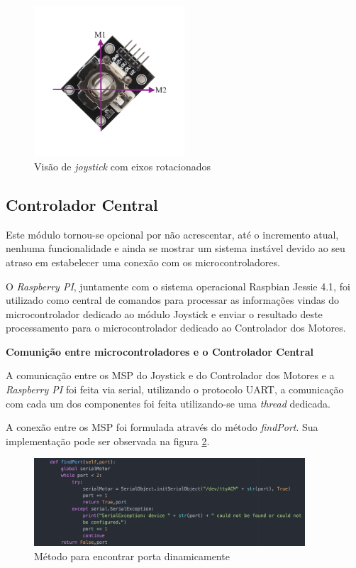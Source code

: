 		\begin{figure}[!ht]
			\center
			\includegraphics[width=0.5\textwidth]{figuras/resultados/joy_m1m2}
			\caption{Visão de \textit{joystick} com eixos rotacionados}
			\label{fig:joy_m1m2}
		\end{figure}

	\subsection{Controlador Central}

		Este módulo tornou-se opcional por não acrescentar, até o incremento atual, nenhuma funcionalidade e ainda se mostrar um sistema instável devido ao seu atraso em estabelecer uma conexão com os microcontroladores.

		O \textit{Raspberry PI}, juntamente com o sistema operacional Raspbian Jessie 4.1, foi utilizado como central de comandos para processar as informações vindas do microcontrolador dedicado ao módulo Joystick e enviar o resultado deste processamento para o microcontrolador dedicado ao Controlador dos Motores.

		\textbf{Comunição entre microcontroladores e o Controlador Central}

		A comunicação entre os MSP do Joystick e do Controlador dos Motores e a \textit{Raspberry PI} foi feita via serial, utilizando o protocolo UART, a comunicação com cada um dos componentes foi feita utilizando-se uma \textit{thread} dedicada.

		A conexão entre os MSP foi formulada através do método \textit{findPort}. Sua implementação pode ser observada na figura \ref{fig:find_port_method}.

		\begin{figure}[!htb]
			\centering
			\includegraphics[width=0.9\textwidth]{figuras/resultados/find_port_method}
			\caption{Método para encontrar porta dinamicamente}
			\label{fig:find_port_method}
		\end{figure}

